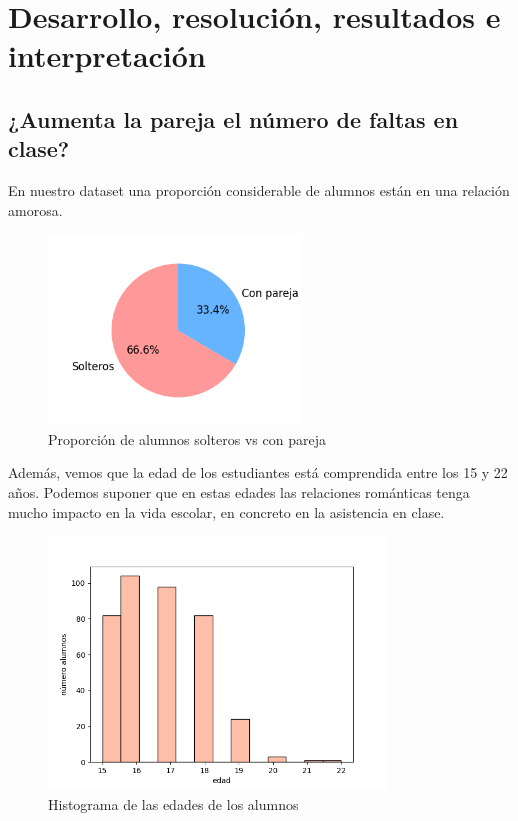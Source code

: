 \chapter{Desarrollo, resolución, resultados e interpretación}

\section{¿Aumenta la pareja el número de faltas en clase?}
En nuestro dataset una proporción considerable de alumnos están en una relación amorosa.

\begin{figure}[H]
    \centering
    \includegraphics[width=0.6\textwidth]{./figures/proporcion-solteros-pareja.png}
    \caption{Proporción de alumnos solteros vs con pareja}
    \label{fig:prop-solteros}
\end{figure}

\pagebreak

Además, vemos que la edad de los estudiantes está comprendida entre los 15 y 22 años. Podemos suponer que en estas edades las relaciones románticas tenga mucho impacto en la vida escolar, en concreto en la asistencia en clase.
\begin{figure}[H]
    \centering
    \includegraphics[width=0.8\textwidth]{./figures/edad-alumnos.png}
    \caption{Histograma de las edades de los alumnos}
    \label{fig:hist-edad}
\end{figure}

